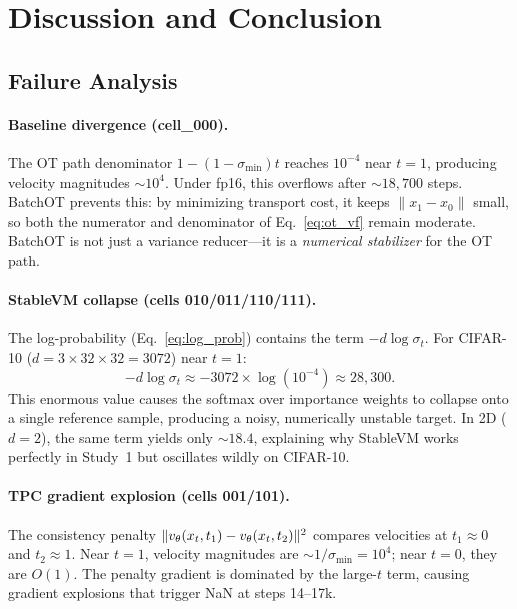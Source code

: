 \section{Discussion and Conclusion}
\label{sec:discussion}

\subsection{Failure Analysis}

\paragraph{Baseline divergence (cell\_000).} The OT path denominator $1-(1-\sigma_{\min})t$ reaches $10^{-4}$ near $t{=}1$, producing velocity magnitudes ${\sim}10^4$. Under fp16, this overflows after ${\sim}18{,}700$ steps. BatchOT prevents this: by minimizing transport cost, it keeps $\|x_1 - x_0\|$ small, so both the numerator and denominator of Eq.~\ref{eq:ot_vf} remain moderate. BatchOT is not just a variance reducer---it is a \emph{numerical stabilizer} for the OT path.

\paragraph{StableVM collapse (cells 010/011/110/111).} The log-probability (Eq.~\ref{eq:log_prob}) contains the term $-d\log\sigma_t$. For CIFAR-10 ($d = 3{\times}32{\times}32 = 3072$) near $t{=}1$:
\begin{equation*}
    -d\log\sigma_t \approx -3072 \times \log(10^{-4}) \approx 28{,}300.
\end{equation*}
This enormous value causes the softmax over importance weights to collapse onto a single reference sample, producing a noisy, numerically unstable target. In 2D ($d{=}2$), the same term yields only ${\sim}18.4$, explaining why StableVM works perfectly in Study~1 but oscillates wildly on CIFAR-10.

\paragraph{TPC gradient explosion (cells 001/101).} The consistency penalty $\|v_\theta(x_t,t_1) - v_\theta(x_t,t_2)\|^2$ compares velocities at $t_1 \approx 0$ and $t_2 \approx 1$. Near $t{=}1$, velocity magnitudes are ${\sim}1/\sigma_{\min} = 10^4$; near $t{=}0$, they are $O(1)$. The penalty gradient is dominated by the large-$t$ term, causing gradient explosions that trigger NaN at steps 14--17k.

